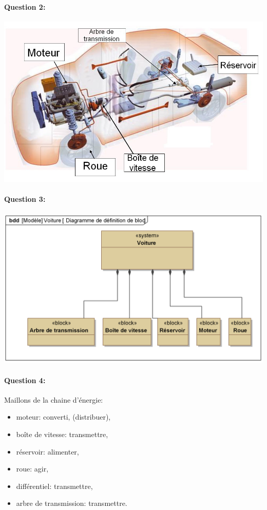 \paragraph{Question 2:} 

\begin{center}
	\includegraphics[width=0.6\linewidth]{img/Transmission_cor}
\end{center}

\paragraph{Question 3:}

\begin{center}
	\includegraphics[width=0.6\linewidth]{img/Voiture_bloc}
\end{center}

\paragraph{Question 4:}

Maillons de la chaine d'énergie:
\begin{itemize}
 \item moteur: converti, (distribuer),
 \item boîte de vitesse: transmettre,
 \item réservoir: alimenter,
 \item roue: agir,
 \item différentiel: transmettre,
 \item arbre de transmission: transmettre.
\end{itemize}

